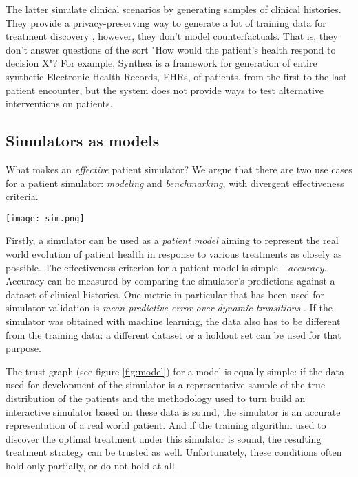 The latter simulate clinical scenarios by generating samples of clinical histories.
They provide a privacy-preserving way to generate a lot of training data for treatment discovery \cite{privacy1,privacy2,privacy3,privacy4}, however, they don't model counterfactuals. That is, they don't answer questions of the sort "How would the patient's health respond to decision X"? For example, Synthea \cite{synthea} is a framework for generation of entire synthetic Electronic Health Records, EHRs, of patients, from the first to the last patient encounter, but the system does not provide ways to test alternative interventions on patients. 

\subsection{Simulators as models}

What makes an \emph{effective} patient simulator? 
We argue that there are two use cases for a patient simulator: {\sl modeling} and {\sl benchmarking}, with divergent effectiveness criteria.

\begin{figure*}
    \centering
    \texttt{[image: sim.png]}
    \caption{Trust graph of simulator as a model}
    \label{fig:model}
\end{figure*}

Firstly, a simulator can be used as a \emph{patient model} aiming to represent the real world evolution of patient health in response to various treatments as closely as possible.
The effectiveness criterion for a patient model is simple - \emph{accuracy}.
Accuracy can be measured by comparing the simulator's predictions against a dataset of clinical histories.
One metric in particular that has been used for simulator validation is \emph{mean predictive error over dynamic transitions} \cite{mdpe}.
If the simulator was obtained with machine learning, the data also has to be different from the training data: a different dataset or a holdout set can be used for that purpose.

The trust graph (see figure \ref{fig:model}) for a model is equally simple: if the data used for development of the simulator is a representative sample of the true distribution of the patients and the methodology used to turn build an interactive simulator based on these data is sound, the simulator is an accurate representation of a real world patient.
And if the training algorithm used to discover the optimal treatment under this simulator is sound, the resulting treatment strategy can be trusted as well.
Unfortunately, these conditions often hold only partially, or do not hold at all.

